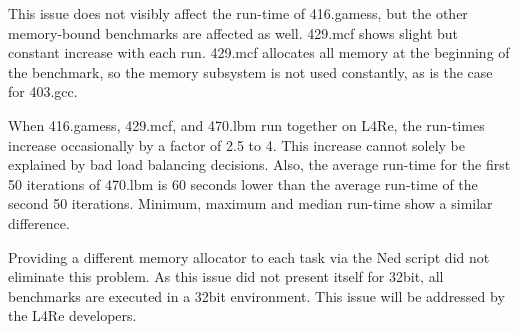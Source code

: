 This issue does not visibly affect the run-time of 416.gamess, but the other memory-bound
benchmarks are affected as well.
429.mcf shows slight but constant increase with each run.
429.mcf allocates all memory at the beginning of the benchmark, so the memory
subsystem is not used constantly, as is the case for 403.gcc.

When 416.gamess, 429.mcf, and 470.lbm run together on L4Re, the run-times
increase occasionally by a factor of 2.5 to 4.
This increase cannot solely be explained by bad load balancing decisions.
Also, the average run-time for the first 50 iterations of 470.lbm is 60 seconds
lower than the average run-time of the second 50 iterations.
Minimum, maximum and median run-time show a similar difference.

Providing a different memory allocator to each task via the Ned script
did not eliminate this problem.
As this issue did not present itself for 32bit, all benchmarks are executed
in a 32bit environment. This issue will be addressed by the L4Re developers.


\begin{comment}
\paragraph{Benchmarks.}
SPEC progs:
solo runs: SLD, STB, MIPC, CFS
group runs: SLD, STB, MIPC, CFS
--> degradation of median compared  to solo runs

Group runs for different SMT algos: RR, load,
Group runs for different MIPC assignments: load, mpc-ipc

pingpong  clsvr group;
openmp-mmul distribution group; -- load generated by other mmul or fractal



\paragraph{Group Configuration Benchmarks}
The first is a simple \gls{ipc} ping-pong, where the server answers a call from
the client with the number of the core it is currently running on.
The client measures the time for the \gls{ipc} call and prints the answer of
the server together with its own core number and the \gls{ipc} duration.

\end{comment}

